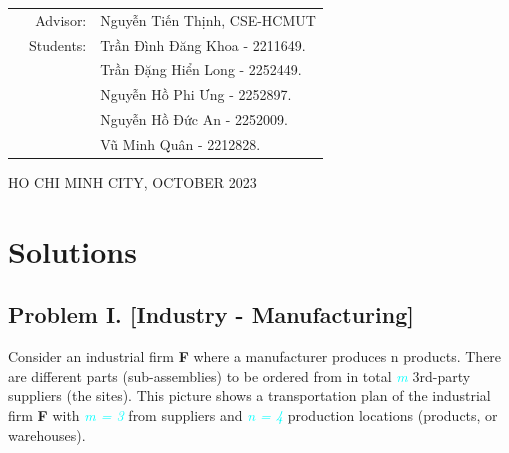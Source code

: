 \documentclass[a4paper]{article}
\begin{document}
\begin{titlepage}
\begin{table}[h]
	\begin{tabular}{rrl}
		\hspace{5 cm} & Advisor: & Nguyễn Tiến Thịnh, CSE-HCMUT\\[6pt]
		& Students: & Trần Đình Đăng Khoa \hspace*{0.05cm} - 2211649. \\
		& 			& Trần Đặng Hiển Long \hspace*{0.15cm} - 2252449. \\
		& 			& Nguyễn Hồ Phi Ưng	  \hspace*{0.41cm} - 2252897. \\
		& 			& Nguyễn Hồ Đức An 	  \hspace*{0.5cm} - 2252009. \\
		& 			& Vũ Minh Quân		  \hspace*{1.2cm} - 2212828. \\
	\end{tabular}
\end{table}

\vspace*{1cm}

\begin{center}
{\footnotesize HO CHI MINH CITY, OCTOBER 2023}
\end{center}
\end{titlepage}


\newpage
\tableofcontents




\newpage
\section{Solutions}
	\subsection{Problem I. [Industry - Manufacturing]}
	\qquad Consider an industrial firm \textbf{F} where a manufacturer produces n products.
There are different parts (sub-assemblies) to be ordered from in total \textcolor{cyan}{\textit{m}} 3rd-party suppliers (the
sites). This picture shows a transportation plan of the industrial firm \textbf{F} with \textcolor{cyan}{\textit{m = 3}} from suppliers and \textcolor{cyan}{\textit{n = 4}} production locations (products, or warehouses).
\end{document}
